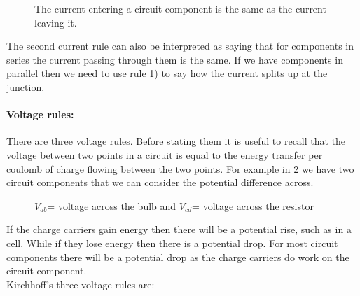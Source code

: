 \documentclass[a4paper,12pt]{book}
\begin{document}
 \begin{figure}[ht]
    \centering
    \caption{The current entering a circuit component is the same as the current leaving it.}
    \label{fig: K2}
\end{figure}

The second current rule can also be interpreted as saying that for components in series the current passing through them is the same. If we have components in parallel then we need to use rule 1) to say how the current splits up at the junction.

\paragraph{Voltage rules:} There are three voltage rules. Before stating them it is useful to recall that the voltage between two points in a circuit is equal to the energy transfer per coulomb of charge flowing between the two points.  For example in \cref{fig: voltage rule 0} we have two circuit components that we can consider the potential difference across. 

\begin{figure}[ht]
    \centering
    \caption{$V_{ab}$= voltage across the bulb and $V_{cd}$= voltage across the resistor}
    \label{fig: voltage rule 0}
\end{figure}

If the charge carriers gain energy then there will be a potential rise, such as in a cell. While if they lose energy then there is a potential drop. For most circuit components there will be a potential drop as the charge carriers do work on the circuit component.\\

Kirchhoff's three voltage rules are:
\end{document}
